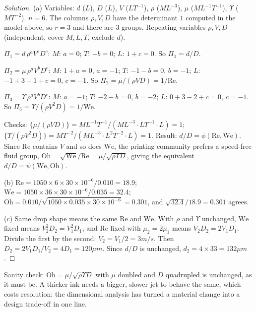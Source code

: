 \begin{proof}[Solution]
(a) Variables: $d$ ($L$), $D$ ($L$), $V$ ($LT^{-1}$), $\rho$ ($ML^{-3}$), $\mu$ ($ML^{-1}T^{-1}$), $\Upsilon$ ($MT^{-2}$). $n = 6$. The columns $\rho, V, D$ have the determinant $1$ computed in the model above, so $r = 3$ and there are $3$ groups. Repeating variables $\rho, V, D$ (independent, cover $M, L, T$, exclude $d$).

$\Pi_1 = d\,\rho^aV^bD^c$: $M$: $a = 0$; $T$: $-b = 0$; $L$: $1 + c = 0$. So $\Pi_1 = d/D$.

$\Pi_2 = \mu\,\rho^aV^bD^c$: $M$: $1 + a = 0$, $a = -1$; $T$: $-1 - b = 0$, $b = -1$; $L$: $-1 + 3 - 1 + c = 0$, $c = -1$. So $\Pi_2 = \mu/(\rho V D) = 1/\mathrm{Re}$.

$\Pi_3 = \Upsilon\,\rho^aV^bD^c$: $M$: $a = -1$; $T$: $-2 - b = 0$, $b = -2$; $L$: $0 + 3 - 2 + c = 0$, $c = -1$. So $\Pi_3 = \Upsilon/(\rho V^2 D) = 1/\mathrm{We}$.

Checks: $\{\mu/(\rho VD)\} = ML^{-1}T^{-1}/(ML^{-3}\cdot LT^{-1}\cdot L) = 1$; $\{\Upsilon/(\rho V^2D)\} = MT^{-2}/(ML^{-3}\cdot L^2T^{-2}\cdot L) = 1$. Result: $d/D = \phi(\mathrm{Re}, \mathrm{We})$. Since $\mathrm{Re}$ contains $V$ and so does $\mathrm{We}$, the printing community prefers a speed-free fluid group, $\mathrm{Oh} = \sqrt{\mathrm{We}}/\mathrm{Re} = \mu/\sqrt{\rho\Upsilon D}$, giving the equivalent $d/D = \psi(\mathrm{We}, \mathrm{Oh})$.

(b) $\mathrm{Re} = 1050 \times 6 \times 30\times10^{-6}/0.010 = 18.9$; $\mathrm{We} = 1050 \times 36 \times 30\times10^{-6}/0.035 = 32.4$; $\mathrm{Oh} = 0.010/\sqrt{1050 \times 0.035 \times 30\times10^{-6}} = 0.301$, and $\sqrt{32.4}/18.9 = 0.301$ agrees.

(c) Same drop shape means the same $\mathrm{Re}$ and $\mathrm{We}$. With $\rho$ and $\Upsilon$ unchanged, $\mathrm{We}$ fixed means $V_2^2D_2 = V_1^2D_1$, and $\mathrm{Re}$ fixed with $\mu_2 = 2\mu_1$ means $V_2D_2 = 2V_1D_1$. Divide the first by the second: $V_2 = V_1/2 = 3\unit{m/s}$. Then $D_2 = 2V_1D_1/V_2 = 4D_1 = 120\unit{\mu m}$. Since $d/D$ is unchanged, $d_2 = 4 \times 33 = 132\unit{\mu m}$.
\end{proof}

Sanity check: $\mathrm{Oh} = \mu/\sqrt{\rho\Upsilon D}$ with $\mu$ doubled and $D$ quadrupled is unchanged, as it must be. A thicker ink needs a bigger, slower jet to behave the same, which costs resolution: the dimensional analysis has turned a material change into a design trade-off in one line.

